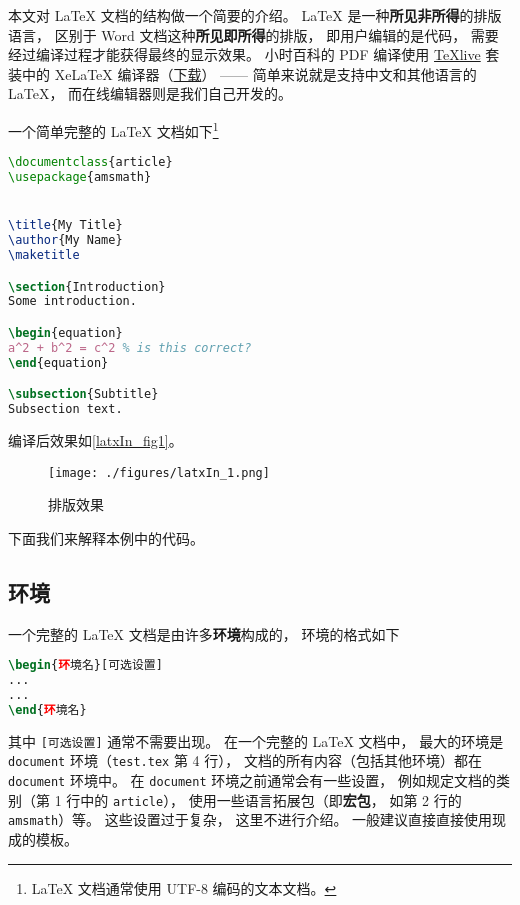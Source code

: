 
本文对 LaTeX 文档的结构做一个简要的介绍。 LaTeX 是一种\textbf{所见非所得}的排版语言， 区别于 Word 文档这种\textbf{所见即所得}的排版， 即用户编辑的是代码， 需要经过编译过程才能获得最终的显示效果。 小时百科的 PDF 编译使用 \href{https://www.tug.org/texlive/}{TeXlive} 套装中的 XeLaTeX 编译器（\href{https://www.tug.org/texlive/acquire-iso.html}{下载}）%
—— 简单来说就是支持中文和其他语言的 LaTeX， 而在线编辑器则是我们自己开发的。

一个简单完整的 LaTeX 文档如下\footnote{LaTeX 文档通常使用 UTF-8 编码的文本文档。}

\begin{lstlisting}[language=latex, caption=test.tex]
\documentclass{article}
\usepackage{amsmath}


\title{My Title}
\author{My Name}
\maketitle

\section{Introduction}
Some introduction.

\begin{equation}
a^2 + b^2 = c^2 % is this correct?
\end{equation}

\subsection{Subtitle}
Subsection text.


\end{lstlisting}

编译后效果如\autoref{latxIn_fig1}。
\begin{figure}[ht]
\centering
\texttt{[image: ./figures/latxIn\_1.png]}
\caption{排版效果} \label{latxIn_fig1}
\end{figure}
下面我们来解释本例中的代码。

\subsection{环境}
一个完整的 LaTeX 文档是由许多\textbf{环境}构成的， 环境的格式如下
\begin{lstlisting}[language=latex]
\begin{环境名}[可选设置]
...
...
\end{环境名}
\end{lstlisting}
其中 \verb|[可选设置]| 通常不需要出现。 在一个完整的 LaTeX 文档中， 最大的环境是 \verb|document| 环境（\verb|test.tex| 第 4 行）， 文档的所有内容（包括其他环境）都在 \verb|document| 环境中。 在 \verb|document| 环境之前通常会有一些设置， 例如规定文档的类别（第 1 行中的 \verb|article|）， 使用一些语言拓展包（即\textbf{宏包}， 如第 2 行的 \verb|amsmath|）等。 这些设置过于复杂， 这里不进行介绍。 一般建议直接直接使用现成的模板。

